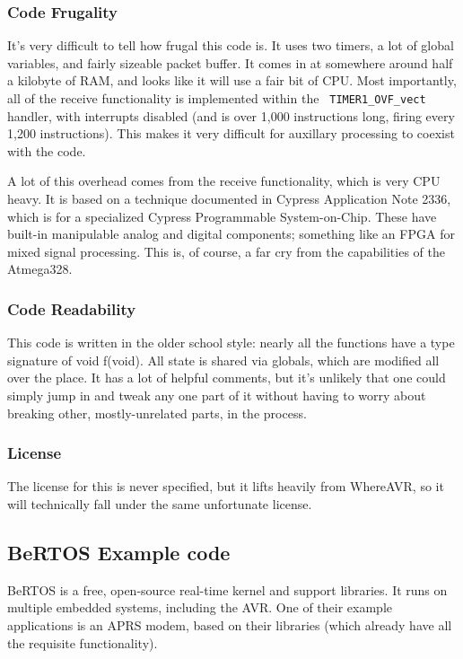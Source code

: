 \documentclass{article}
\begin{document}
\subsubsection{Code Frugality}

It's very difficult to tell how frugal this code is.  It uses two
timers, a lot of global variables, and fairly sizeable packet buffer.
It comes in at somewhere around half a kilobyte of RAM, and looks like
it will use a fair bit of CPU.  Most importantly, all of the receive
functionality is implemented within the \texttt{ TIMER1\_OVF\_vect }
handler, with interrupts disabled (and is over 1,000 instructions
long, firing every 1,200 instructions).  This makes it very difficult
for auxillary processing to coexist with the code.

A lot of this overhead comes from the receive functionality, which is
very CPU heavy.  It is based on a technique documented in Cypress
Application Note 2336\cite{cypress2336},  which is for a specialized
Cypress Programmable System-on-Chip.  These have built-in manipulable
analog and digital components; something like an FPGA for mixed signal
processing.  This is, of course, a far cry from the capabilities of
the Atmega328.

\subsubsection{Code Readability}

This code is written in the older school style: nearly all the
functions have a type signature of void f(void).  All state is shared
via globals, which are modified all over the place.  It has a lot of
helpful comments, but it's unlikely that one could simply jump in and
tweak any one part of it without having to worry about breaking other,
mostly-unrelated parts, in the process.


\subsubsection{License}

The license for this is never specified, but it lifts heavily from
WhereAVR, so it will technically fall under the same unfortunate
license.

\subsection{BeRTOS Example code}

BeRTOS\cite{BeRTOS} is a free, open-source real-time kernel and
support libraries.  It runs on multiple embedded systems, including
the AVR.  One of their example applications\cite{BeRTOSAPRS} is an APRS modem, based on
their libraries (which already have all the requisite functionality).
\end{document}
